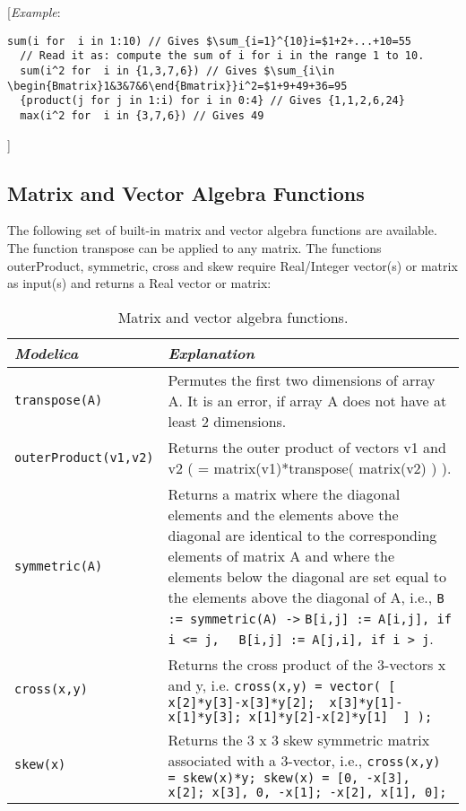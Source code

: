 {[}\emph{Example}:

\begin{lstlisting}[language=modelica, mathescape=true, frame=none]
  sum(i for  i in 1:10) // Gives $\sum_{i=1}^{10}i=$1+2+...+10=55
  // Read it as: compute the sum of i for i in the range 1 to 10.
  sum(i^2 for  i in {1,3,7,6}) // Gives $\sum_{i\in \begin{Bmatrix}1&3&7&6\end{Bmatrix}}i^2=$1+9+49+36=95
  {product(j for j in 1:i) for i in 0:4} // Gives {1,1,2,6,24}
  max(i^2 for  i in {3,7,6}) // Gives 49
\end{lstlisting}
{]}

\subsection{Matrix and Vector Algebra Functions}

The following set of built-in matrix and vector algebra functions are
available. The function transpose can be applied to any matrix. The
functions outerProduct, symmetric, cross and skew require Real/Integer
vector(s) or matrix as input(s) and returns a Real vector or matrix:

\begin{longtable}[]{|p{3.5cm}|p{11.5cm}|}
\caption{Matrix and vector algebra functions.}\\
\hline
\emph{Modelica} & \emph{Explanation}\\ \hline
\endhead
\lstinline!transpose(A)!
& Permutes the first two dimensions of array A. It is an error, if array A
does not have at least 2 dimensions.\\ \hline
\lstinline!outerProduct(v1,v2)!
& Returns the outer product of vectors v1 and v2 ( = matrix(v1)*transpose(
matrix(v2) ) ).\\ \hline
\lstinline!symmetric(A)!
& Returns a matrix where the diagonal elements and the elements above the
diagonal are identical to the corresponding elements of matrix A and
where the elements below the diagonal are set equal to the elements
above the diagonal of A, i.e., \lstinline!B := symmetric(A) ->!
  \lstinline!B[i,j] := A[i,j], if i <= j, ! \lstinline! B[i,j] := A[j,i], if i > j!.\\ \hline
\lstinline!cross(x,y)!
& Returns the cross product of the 3-vectors x and y, i.e.
\lstinline!cross(x,y) = vector( [ x[2]*y[3]-x[3]*y[2];  x[3]*y[1]-x[1]*y[3]; x[1]*y[2]-x[2]*y[1]  ] );!\\ \hline
\lstinline!skew(x)!
& Returns the 3 x 3 skew symmetric matrix associated with a 3-vector,
  i.e., \lstinline!cross(x,y) = skew(x)*y; skew(x) = [0, -x[3], x[2]; x[3], 0, -x[1]; -x[2], x[1], 0];!\\ \hline
\end{longtable}

